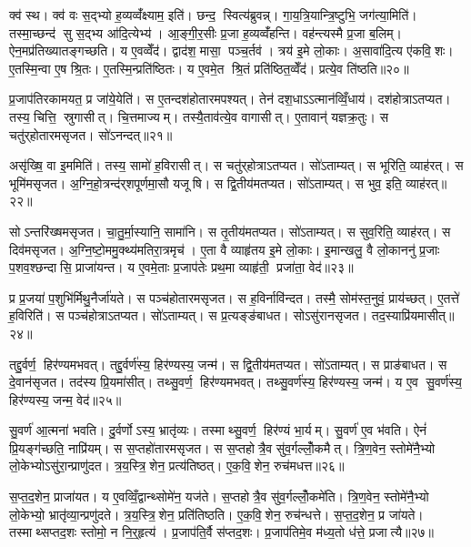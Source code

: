 क्व॑ स्थ। क्व॑ वः स॒द्भ्यो ह॒व्यव्वँ॑क्ष्याम॒ इति॑। छन्द॒ स्वित्य॑ब्रुवन्न्। गा॒य॒त्रि॒यान्त्रि॒ष्टुभि॒ जग॑त्या॒मिति॑। तस्मा॒च्छन्द॑ सु स॒द्भ्य आ॑दि॒त्येभ्य॑। आ॒ङ्गी॒र॒सीः प्र॒जा ह॒व्यव्वँ॑हन्ति। वह॑न्त्यस्मै प्र॒जा ब॒लिम्। ऐन॒मप्र॑तिख्यातङ्गच्छति। य ए॒वव्वेँद॑। द्वाद॑श॒ मासा॒ पञ्च॒र्तव॑। त्रय॑ इ॒मे लो॒काः। अ॒सावा॑दि॒त्य ए॑कवि॒शः। ए॒तस्मि॒न्वा ए॒ष श्रि॒तः। ए॒तस्मि॒न्प्रति॑ष्ठितः। य ए॒वमे॒त श्रि॒तं प्रति॑ष्ठित॒व्वेँद॑। प्रत्ये॒व ति॑ष्ठति॥२०॥\anuvakamend[स्या॒दिति॑ संवत्स॒रो ज॑नयध्व॒मितीत्य॑ब्रवी॒त्पूर्व॒ इत्या॑दि॒त्यानृ॒तव॒ष्षट्च॑]

प्र॒जाप॑तिरकामयत॒ प्र जा॑ये॒येति॑। स ए॒तन्दश॑होतारमपश्यत्। तेन॑ दश॒धाऽऽत्मान॑व्विँ॒धाय॑। दश॑होत्राऽतप्यत। तस्य॒ चित्ति॒ स्रुगासीत्। चि॒त्तमाज्यम्। तस्यै॒ताव॑त्ये॒व वागासीत्। ए॒तावान्॑ यज्ञक्र॒तुः। स चतु॑र्‌होतारमसृजत। सो॑ऽनन्दत्॥२१॥

असृ॑ख्षि॒ वा इ॒ममिति॑। तस्य॒ सामो॑ ह॒विरासीत्। स चतु॑र्‌होत्राऽतप्यत। सो॑ऽताम्यत्। स भूरिति॒ व्याह॑रत्। स भूमि॑मसृजत। अ॒ग्नि॒हो॒त्रन्द॑र्‌शपूर्णमा॒सौ यजूषि। स द्वि॒तीय॑मतप्यत। सो॑ऽताम्यत्। स भुव॒ इति॒ व्याह॑रत्॥२२॥

सोऽन्तरि॑ख्षमसृजत। चा॒तु॒र्मा॒स्यानि॒ सामा॑नि। स तृ॒तीय॑मतप्यत। सो॑ऽताम्यत्। स सुव॒रिति॒ व्याह॑रत्। स दिव॑मसृजत। अ॒ग्नि॒ष्टो॒ममु॒क्थ्य॑मतिरा॒त्रमृच॑। ए॒ता वै व्याहृ॑तय इ॒मे लो॒काः। इ॒मान्खलु॒ वै लो॒काननु॑ प्र॒जाः प॒शव॒श्छन्दासि॒ प्राजा॑यन्त। य ए॒वमे॒ताः प्र॒जाप॑तेः प्रथ॒मा व्याहृ॑ती॒ प्रजा॑ता॒ वेद॑॥२३॥

प्र प्र॒जया॑ प॒शुभि॑र्मिथु॒नैर्जा॑यते। स पञ्च॑होतारमसृजत। स ह॒विर्नावि॑न्दत। तस्मै॒ सोम॑स्त॒नुवं॒ प्राय॑च्छत्। ए॒तत्ते॑ ह॒विरिति॑। स पञ्च॑होत्राऽतप्यत। सो॑ऽताम्यत्। स प्र॒त्यङ्ङ॑बाधत। सोऽसु॑रानसृजत। तद॒स्याप्रि॑यमासीत्॥२४॥

तद्दु॒र्वर्ण॒ हिर॑ण्यमभवत्। तद्दु॒र्वर्ण॑स्य॒ हिर॑ण्यस्य॒ जन्म॑। स द्वि॒तीय॑मतप्यत। सो॑ऽताम्यत्। स प्राङ॑बाधत। स दे॒वान॑सृजत। तद॑स्य प्रि॒यमा॑सीत्। तथ्सु॒वर्ण॒ हिर॑ण्यमभवत्। तथ्सु॒वर्ण॑स्य॒ हिर॑ण्यस्य॒ जन्म॑। य ए॒व सु॒वर्ण॑स्य॒ हिर॑ण्यस्य॒ जन्म॒ वेद॑॥२५॥

सु॒वर्ण॑ आ॒त्मना॑ भवति। दु॒र्वर्णोऽस्य॒ भ्रातृ॑व्यः। तस्माथ्सु॒वर्ण॒ हिर॑ण्यं भा॒र्यम्। सु॒वर्ण॑ ए॒व भ॑वति। ऐनं॑ प्रि॒यङ्ग॑च्छति॒ नाप्रि॑यम्। स स॒प्तहो॑तारमसृजत। स स॒प्तहोत्रै॒व सु॑व॒र्गल्लोँ॒कमैत्। त्रि॒ण॒वेन॒ स्तोमे॑नै॒भ्यो लो॒केभ्योऽसु॑रा॒न्प्राणु॑दत। त्र॒य॒स्त्रि॒शेन॒ प्रत्य॑तिष्ठत्। ए॒क॒वि॒शेन॒ रुच॑मधत्त॥२६॥

स॒प्त॒द॒शेन॒ प्राजा॑यत। य ए॒वव्विँ॒द्वान्थ्सोमे॑न॒ यज॑ते। स॒प्तहोत्रै॒व सु॑व॒र्गल्लोँ॒कमे॑ति। त्रि॒ण॒वेन॒ स्तोमे॑नै॒भ्यो लो॒केभ्यो॒ भ्रातृ॑व्या॒न्प्रणु॑दते। त्र॒य॒स्त्रि॒शेन॒ प्रति॑तिष्ठति। ए॒क॒वि॒शेन॒ रुच॑न्धत्ते। स॒प्त॒द॒शेन॒ प्र जा॑यते। तस्माथ्सप्तद॒शः स्तोमो॒ न नि॒र्॒हृत्य॑। प्र॒जाप॑ति॒र्वै स॑प्तद॒शः। प्र॒जाप॑तिमे॒व म॑ध्य॒तो ध॑त्ते॒ प्रजात्यै॥२७॥\anuvakamend[अ॒न॒न्द॒द्भुव॒ इति॒ व्याह॑र॒द्वेदा॑सी॒द्वेदा॑धत्त॒ प्रजात्यै]

